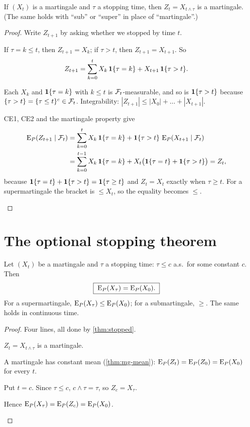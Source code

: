 \begin{theorem}
\label{thm:stopped}
If $(X_t)$ is a martingale and $\tau$ a stopping time, then $Z_t=X_{t\wedge\tau}$ is a martingale. (The same holds with ``sub'' or ``super'' in place of ``martingale''.)
\end{theorem}
\begin{proof}
Write $Z_{t+1}$ by asking whether we stopped by time $t$.
\begin{steps}
  \item If $\tau=k\le t$, then $Z_{t+1}=X_k$; if $\tau>t$, then $Z_{t+1}=X_{t+1}$. So
  \[
    Z_{t+1}=\sum_{k=0}^tX_k\,\mathbf{1}\{\tau=k\}+X_{t+1}\,\mathbf{1}\{\tau>t\}.
  \]
  \item Each $X_k$ and $\mathbf{1}\{\tau=k\}$ with $k\le t$ is $\mathcal F_t$-measurable, and so is $\mathbf{1}\{\tau>t\}$ because $\{\tau>t\}=\{\tau\le t\}^c\in\mathcal F_t$. Integrability: $|Z_{t+1}|\le|X_0|+\dots+|X_{t+1}|$.
  \item CE1, CE2 and the martingale property give
  \[
    \begin{aligned}
    \operatorname{E}_P(Z_{t+1}\mid\mathcal F_t)&=\sum_{k=0}^tX_k\,\mathbf{1}\{\tau=k\}+\mathbf{1}\{\tau>t\}\,\operatorname{E}_P(X_{t+1}\mid\mathcal F_t)\\
    &=\sum_{k=0}^{t-1}X_k\,\mathbf{1}\{\tau=k\}+X_t\big(\mathbf{1}\{\tau=t\}+\mathbf{1}\{\tau>t\}\big)=Z_t ,
    \end{aligned}
  \]
  because $\mathbf{1}\{\tau=t\}+\mathbf{1}\{\tau>t\}=\mathbf{1}\{\tau\ge t\}$ and $Z_t=X_t$ exactly when $\tau\ge t$.
  For a supermartingale the bracket is $\le X_t$, so the equality becomes $\le$. \qedhere
\end{steps}
\end{proof}

\section{The optional stopping theorem}

\begin{theorem}
\label{thm:ost}
Let $(X_t)$ be a martingale and $\tau$ a  stopping time: $\tau\le c$ a.s.\ for some constant $c$. Then
\[
  \boxed{\;\operatorname{E}_P(X_\tau)=\operatorname{E}_P(X_0).\;}
\]
For a supermartingale, $\operatorname{E}_P(X_\tau)\le\operatorname{E}_P(X_0)$; for a submartingale, $\ge$. The same holds in continuous time.
\end{theorem}
\begin{proof}
Four lines, all done by \cref{thm:stopped}.
\begin{steps}
  \item $Z_t=X_{t\wedge\tau}$ is a martingale.
  \item A martingale has constant mean (\cref{thm:mg-mean}): $\operatorname{E}_P(Z_t)=\operatorname{E}_P(Z_0)=\operatorname{E}_P(X_0)$ for every $t$.
  \item Put $t=c$. Since $\tau\le c$, $c\wedge\tau=\tau$, so $Z_c=X_\tau$.
  \item Hence $\operatorname{E}_P(X_\tau)=\operatorname{E}_P(Z_c)=\operatorname{E}_P(X_0)$. \qedhere
\end{steps}
\end{proof}

